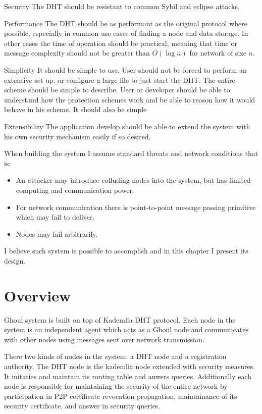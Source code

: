 \begin{description}
  \item{Security} The DHT should be resistant to common Sybil and eclipse
    attacks.
  \item{Performance} The DHT should be as performant as the original protocol
    where possible, especially in common use cases of finding a node and data
    storage. In other cases the time of operation should be practical, meaning
    that time or message complexity should not be greater than $O(\log n)$ for
    network of size $n$.
  \item{Simplicity} It should be simple to use. User should not be forced to
    perform an extensive set up, or configure a large file to just start the
    DHT.  The entire scheme should be simple to describe. User or developer
    should be able to understand how the protection schemes work and be able to
    reason how it would behave in his scheme. It should also be simple
  \item{Extensibility} The application develop should be able to extend the
    system with his own security mechanism easily if so desired.
\end{description}

When building the system I assume standard threats and network conditions that
is:

\begin{itemize}
  \item An attacker may introduce colluding nodes into the system, but has
    limited computing and communication power.
  \item For network communication there is point-to-point message passing
    primitive which may fail to deliver.
  \item Nodes may fail arbitrarily.
\end{itemize}

I believe such system is possible to accomplish and in this chapter I present
its design.

\section{Overview}
Ghoul system is built on top of Kademlia DHT protocol. Each node in the system
is an independent agent which acts as a Ghoul node and communicates with other
nodes using messages sent over network transmission.

There two kinds of nodes in the system: a DHT node and a registration authority.
The DHT node is the kademlia node extended with security measures. It initaties
and maintain its routing table and anwers queries. Additionally each node is
responsible for maintaining the security of the entire network by participation
in P2P certificate revocation propagation, maintainance of its security
certificate, and answer in security queries.

